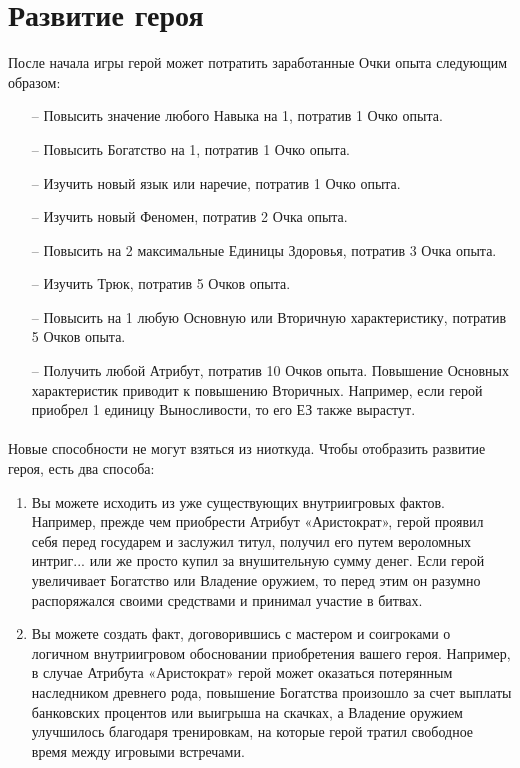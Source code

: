 \section{Развитие героя}
После начала игры герой может потратить заработанные Очки опыта следующим образом:
\begin{itemize}
\item[--] Повысить значение любого Навыка на 1, потратив 1 Очко опыта.
\item[--] Повысить Богатство на 1, потратив 1 Очко опыта.
\item[--] Изучить новый язык или наречие, потратив 1 Очко опыта.
\item[--] Изучить новый Феномен, потратив 2 Очка опыта.
\item[--] Повысить на 2 максимальные Единицы Здоровья, потратив 3 Очка опыта.
\item[--] Изучить Трюк, потратив 5 Очков опыта.
\item[--] Повысить на 1 любую Основную или Вторичную характеристику, потратив 5 Очков опыта.
\item[--] Получить любой Атрибут, потратив 10 Очков опыта.
Повышение Основных характеристик приводит к повышению Вторичных. Например, если герой приобрел 1 единицу Выносливости, то его ЕЗ также вырастут.
\end{itemize}
\paragraph{}
Новые способности не могут взяться из ниоткуда. Чтобы отобразить развитие героя, есть два способа:
\begin{enumerate}
\item Вы можете исходить из уже существующих внутриигровых фактов. Например, прежде чем приобрести Атрибут «Аристократ», герой проявил себя перед государем и заслужил титул, получил его путем вероломных интриг... или же просто купил за внушительную сумму денег. Если герой увеличивает Богатство или Владение оружием, то перед этим он разумно распоряжался своими средствами и принимал участие в битвах.
\item Вы можете создать факт, договорившись с мастером и соигроками о логичном внутриигровом обосновании приобретения вашего героя. Например, в случае Атрибута «Аристократ» герой может оказаться потерянным наследником древнего рода, повышение Богатства произошло за счет выплаты банковских процентов или выигрыша на скачках, а Владение оружием улучшилось благодаря тренировкам, на которые герой тратил свободное время между игровыми встречами.
\end{enumerate}